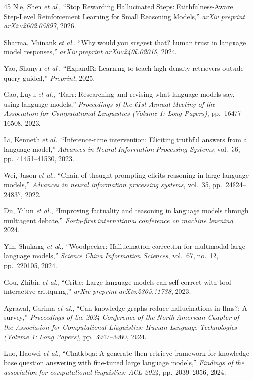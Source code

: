 \documentclass[journal]{IEEEtran}
\begin{document}
\begin{thebibliography}{45}
Nie, Shen \emph{et al.}, ``Stop Rewarding Hallucinated Steps: Faithfulness-Aware Step-Level Reinforcement Learning for Small Reasoning Models,'' \emph{arXiv preprint arXiv:2602.05897}, 2026.

Sharma, Mrinank \emph{et al.}, ``Why would you suggest that? human trust in language model responses,'' \emph{arXiv preprint arXiv:2406.02018}, 2024.

Yao, Shunyu \emph{et al.}, ``ExpandR: Learning to teach high density retrievers outside query guided,'' \emph{Preprint}, 2025.

Gao, Luyu \emph{et al.}, ``Rarr: Researching and revising what language models say, using language models,'' \emph{Proceedings of the 61st Annual Meeting of the Association for Computational Linguistics (Volume 1: Long Papers)}, pp.~16477--16508, 2023.

Li, Kenneth \emph{et al.}, ``Inference-time intervention: Eliciting truthful answers from a language model,'' \emph{Advances in Neural Information Processing Systems}, vol.~36, pp.~41451--41530, 2023.

Wei, Jason \emph{et al.}, ``Chain-of-thought prompting elicits reasoning in large language models,'' \emph{Advances in neural information processing systems}, vol.~35, pp.~24824--24837, 2022.

Du, Yilun \emph{et al.}, ``Improving factuality and reasoning in language models through multiagent debate,'' \emph{Forty-first international conference on machine learning}, 2024.

Yin, Shukang \emph{et al.}, ``Woodpecker: Hallucination correction for multimodal large language models,'' \emph{Science China Information Sciences}, vol.~67, no.~12, pp.~220105, 2024.

Gou, Zhibin \emph{et al.}, ``Critic: Large language models can self-correct with tool-interactive critiquing,'' \emph{arXiv preprint arXiv:2305.11738}, 2023.

Agrawal, Garima \emph{et al.}, ``Can knowledge graphs reduce hallucinations in llms?: A survey,'' \emph{Proceedings of the 2024 Conference of the North American Chapter of the Association for Computational Linguistics: Human Language Technologies (Volume 1: Long Papers)}, pp.~3947--3960, 2024.

Luo, Haowei \emph{et al.}, ``Chatkbqa: A generate-then-retrieve framework for knowledge base question answering with fine-tuned large language models,'' \emph{Findings of the association for computational linguistics: ACL 2024}, pp.~2039--2056, 2024.


\end{thebibliography}
\end{document}
